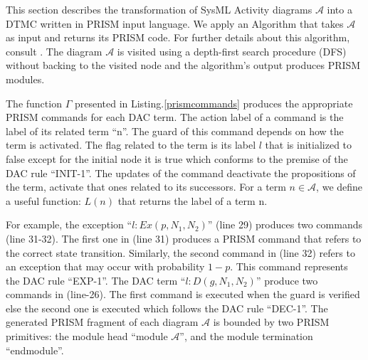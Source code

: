 \documentclass[3p,times,procedia,authoryear,round]{elsarticle}
\begin{document}
This section describes the transformation of SysML Activity diagrams $\mathscr{A}$ into a DTMC written in PRISM input language. We apply an  Algorithm  that takes $\mathscr{A}$ as input and returns its PRISM code. For further details about this algorithm, consult \citep{Ouchani20142713}.   The diagram $\mathscr{A}$ is visited using a depth-first search procedure (DFS) without backing to the visited node and the algorithm's output produces PRISM modules. 

The function $\Gamma$ presented in Listing.\ref{prismcommands} produces the appropriate PRISM commands for each DAC term. The action label of a command is the label of its related term ``n''. The guard of this command depends on how the term is activated. The flag related to the term is its label $l$ that is initialized to false except for the initial node it is true which conforms to the premise of the DAC rule ``INIT-1''. The updates of the command deactivate the propositions of the term, activate that ones related to its successors. For a term $n \in \mathscr{A}$, we define a useful function: $L(n)$ that returns the label of a term n. 

For example, the exception ``$l : Ex(p, N_{1}, N_{2}) $'' (line 29) produces two commands (line 31-32). The first one in (line 31) produces a PRISM command that refers to the correct state transition. Similarly, the second command in (line 32) refers to an exception that may occur with probability $1-p$. This command represents the DAC rule ``EXP-1''.  The DAC term ``$l : D(g, N_{1}, N_{2}) $'' produce two commands in (line-26). The first command is executed when the guard is verified else the second one is executed which follows the DAC rule ``DEC-1''. The generated PRISM fragment of each diagram $\mathscr{A}$ is bounded by two PRISM primitives: the module head ``module $\mathscr{A}$'', and the module termination ``endmodule''.




\lstset{style=customc,
    label=prismcommands
}
\end{document}
